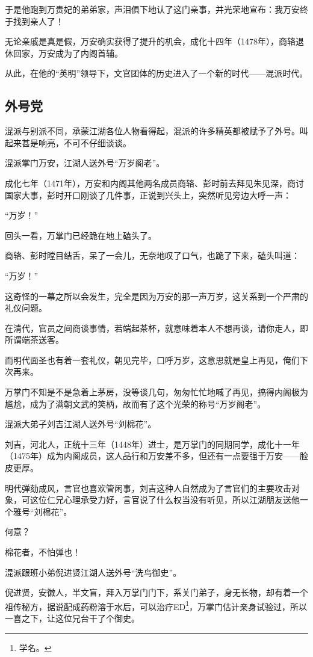 \begin{multicols}{\theparacolNo}
		于是他跑到万贵妃的弟弟家，声泪俱下地认了这门亲事，并光荣地宣布：我万安终于找到亲人了！

		无论亲戚是真是假，万安确实获得了提升的机会，成化十四年（1478年），商辂退休回家，万安成为了内阁首辅。

		从此，在他的“英明”领导下，文官团体的历史进入了一个新的时代——混派时代。

		\subsection{外号党}
		混派与别派不同，承蒙江湖各位人物看得起，混派的许多精英都被赋予了外号。叫起来甚是响亮，不可不仔细谈谈。

		混派掌门万安，江湖人送外号“万岁阁老”。

		成化七年（1471年），万安和内阁其他两名成员商辂、彭时前去拜见朱见深，商讨国家大事，彭时开口刚谈了几件事，正说到兴头上，突然听见旁边大呼一声：

		“万岁！”

		回头一看，万掌门已经跪在地上磕头了。

		商辂、彭时瞠目结舌，呆了一会儿，无奈地叹了口气，也跪了下来，磕头叫道：

		“万岁！”

		这奇怪的一幕之所以会发生，完全是因为万安的那一声万岁，这关系到一个严肃的礼仪问题。

		在清代，官员之间商谈事情，若端起茶杯，就意味着本人不想再谈，请你走人，即所谓端茶送客。

		而明代面圣也有着一套礼仪，朝见完毕，口呼万岁，这意思就是皇上再见，俺们下次再来。

		万掌门不知是不是急着上茅房，没等谈几句，匆匆忙忙地喊了再见，搞得内阁极为尴尬，成为了满朝文武的笑柄，故而有了这个光荣的称号“万岁阁老”。

		混派大弟子刘吉江湖人送外号“刘棉花”。

		刘吉，河北人，正统十三年（1448年）进士，是万掌门的同期同学，成化十一年（1475年）成为内阁成员，这人品行和万安差不多，但还有一点要强于万安——脸皮更厚。

		明代弹劾成风，言官也喜欢管闲事，刘吉这种人自然成为了言官们的主要攻击对象，可这位仁兄心理承受力好，言官说了什么权当没有听见，所以江湖朋友送他一个雅号“刘棉花”。

		何意？

		棉花者，不怕弹也！

		混派跟班小弟倪进贤江湖人送外号“洗鸟御史”。

		倪进贤，安徽人，半文盲，拜入万掌门门下，系关门弟子，身无长物，却有着一个祖传秘方，据说配成药粉溶于水后，可以治疗ED\footnote{学名。}，万掌门估计亲身试验过，所以一喜之下，让这位兄台干了个御史。


\end{multicols}
